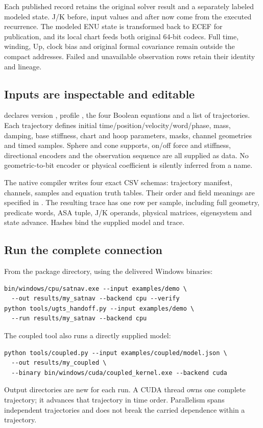 Each published record retains the original solver result and a separately labeled
modeled state. J/K before, input values and after now come from the executed
recurrence. The modeled ENU state is transformed back to ECEF for publication,
and its local chart feeds both original 64-bit codecs. Full time, winding, Up,
clock bias and original formal covariance remain outside the compact addresses.
Failed and unavailable observation rows retain their identity and lineage.

\subsection{Inputs are inspectable and editable}
 declares version , profile
, the four Boolean equations and a list of trajectories. Each
trajectory defines initial time/position/velocity/word/phase, mass, damping, base
stiffness, chart and hoop parameters, masks, channel geometries and timed samples.
Sphere and cone supports, on/off force and stiffness, directional encoders and
the observation sequence are all supplied as data. No geometric-to-bit encoder
or physical coefficient is silently inferred from a name.

The native compiler writes four exact CSV schemas: trajectory manifest, channels,
samples and equation truth tables. Their order and field meanings are specified
in . The resulting trace has one row per sample,
including full geometry, predicate words, ASA tuple, J/K operands, physical
matrices, eigensystem and state advance. Hashes bind the supplied model and trace.

\subsection{Run the complete connection}
From the package directory, using the delivered Windows binaries:
\begin{lstlisting}
bin/windows/cpu/satnav.exe --input examples/demo \
  --out results/my_satnav --backend cpu --verify
python tools/ugts_handoff.py --input examples/demo \
  --run results/my_satnav --backend cpu
\end{lstlisting}
The coupled tool also runs a directly supplied model:
\begin{lstlisting}
python tools/coupled.py --input examples/coupled/model.json \
  --out results/my_coupled \
  --binary bin/windows/cuda/coupled_kernel.exe --backend cuda
\end{lstlisting}
Output directories are new for each run. A CUDA thread owns one complete
trajectory; it advances that trajectory in time order. Parallelism spans independent
trajectories and does not break the carried dependence within a trajectory.
\clearpage


